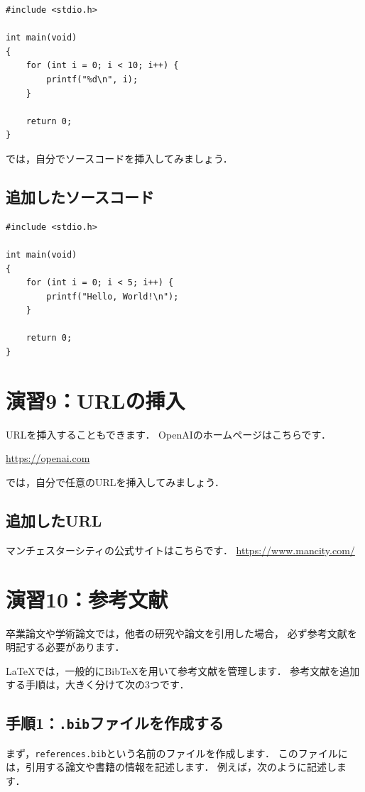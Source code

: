 \documentclass[a4paper,twocolumn]{jsarticle}
\begin{document}
\begin{lstlisting}
#include <stdio.h>

int main(void)
{
    for (int i = 0; i < 10; i++) {
        printf("%d\n", i);
    }

    return 0;
}
\end{lstlisting}

では，自分でソースコードを挿入してみましょう．


\subsection*{追加したソースコード}
\begin{lstlisting}
#include <stdio.h>

int main(void)
{
    for (int i = 0; i < 5; i++) {
        printf("Hello, World!\n");
    }

    return 0;
}
\end{lstlisting}

\section*{演習9：URLの挿入}
URLを挿入することもできます．
OpenAIのホームページはこちらです．

\url{https://openai.com}

では，自分で任意のURLを挿入してみましょう．


\subsection*{追加したURL}
マンチェスターシティの公式サイトはこちらです．
\url{https://www.mancity.com/}

\section*{演習10：参考文献}
卒業論文や学術論文では，他者の研究や論文を引用した場合，
必ず参考文献を明記する必要があります．

LaTeXでは，一般的にBibTeXを用いて参考文献を管理します．
参考文献を追加する手順は，大きく分けて次の3つです．

\subsection*{手順1：\texttt{.bib}ファイルを作成する}
まず，\texttt{references.bib}という名前のファイルを作成します．
このファイルには，引用する論文や書籍の情報を記述します．
例えば，次のように記述します．
\end{document}
